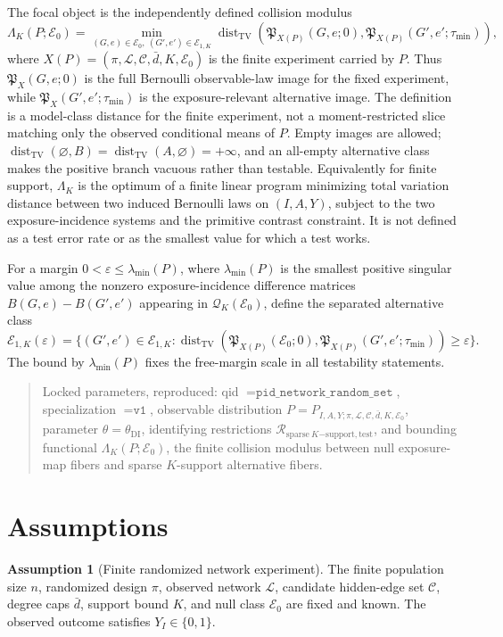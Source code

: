 \documentclass[11pt]{article}
\theoremstyle{definition}
\newtheorem{assumption}{Assumption}
\theoremstyle{plain}
\theoremstyle{remark}
\begin{document}
The focal object is the independently defined collision modulus
\[
\Lambda_K(P;\mathcal E_0)=
\min_{(G,e)\in\mathcal E_0,\ (G',e')\in\mathcal E_{1,K}}
\operatorname{dist}_{\mathrm{TV}}\!\left(
\mathfrak P_{X(P)}(G,e;0),\mathfrak P_{X(P)}(G',e';\tau_{\min})
\right),
\]
where \(X(P)=(\pi,\mathcal L,\mathcal C,\bar d,K,\mathcal E_0)\) is the finite experiment carried by \(P\).
Thus \(\mathfrak P_X(G,e;0)\) is the full Bernoulli observable-law image for the fixed experiment, while \(\mathfrak P_X(G',e';\tau_{\min})\) is the exposure-relevant alternative image.  The definition is a model-class distance for the finite experiment, not a moment-restricted slice matching only the observed conditional means of \(P\).  Empty images are allowed; \(\operatorname{dist}_{\mathrm{TV}}(\varnothing,B)=\operatorname{dist}_{\mathrm{TV}}(A,\varnothing)=+\infty\), and an all-empty alternative class makes the positive branch vacuous rather than testable.  Equivalently for finite support, \(\Lambda_K\) is the optimum of a finite linear program minimizing total variation distance between two induced Bernoulli laws on \((I,A,Y)\), subject to the two exposure-incidence systems and the primitive contrast constraint.  It is not defined as a test error rate or as the smallest value for which a test works.

For a margin \(0<\varepsilon\le \lambda_{\min}(P)\), where \(\lambda_{\min}(P)\) is the smallest positive singular value among the nonzero exposure-incidence difference matrices \(B(G,e)-B(G',e')\) appearing in \(\mathcal Q_K(\mathcal E_0)\), define the separated alternative class
\[
\mathcal E_{1,K}(\varepsilon)=
\{(G',e')\in\mathcal E_{1,K}:\operatorname{dist}_{\mathrm{TV}}(\mathfrak P_{X(P)}(\mathcal E_0;0),\mathfrak P_{X(P)}(G',e';\tau_{\min}))\ge\varepsilon\}.
\]
The bound by \(\lambda_{\min}(P)\) fixes the free-margin scale in all testability statements.

\begin{quote}
\small
Locked parameters, reproduced: qid \(=\texttt{pid\_network\_random\_set}\), specialization \(=\texttt{v1}\), observable distribution \(P=P_{I,A,Y;\pi,\mathcal L,\mathcal C,\bar d,K,\mathcal E_0}\), parameter \(\theta=\theta_{\mathrm{DI}}\), identifying restrictions \(\mathcal R_{\mathrm{sparse}\ K\mathrm{-support,test}}\), and bounding functional \(\Lambda_K(P;\mathcal E_0)\), the finite collision modulus between null exposure-map fibers and sparse \(K\)-support alternative fibers.
\end{quote}

\section{Assumptions}
\begin{assumption}[Finite randomized network experiment]\label{ass:finite}
The finite population size \(n\), randomized design \(\pi\), observed network \(\mathcal L\), candidate hidden-edge set \(\mathcal C\), degree caps \(\bar d\), support bound \(K\), and null class \(\mathcal E_0\) are fixed and known.  The observed outcome satisfies \(Y_I\in\{0,1\}\).
\end{assumption}
\end{document}
